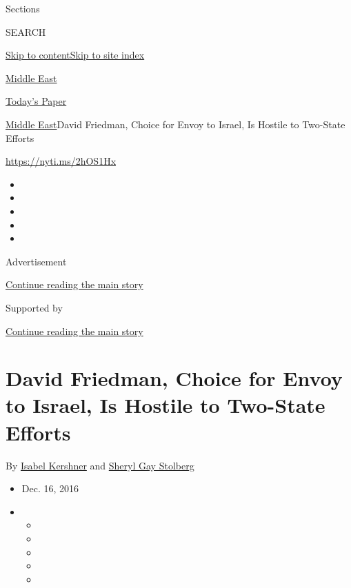 Sections

SEARCH

\protect\hyperlink{site-content}{Skip to
content}\protect\hyperlink{site-index}{Skip to site index}

\href{https://www.nytimes.com/section/world/middleeast}{Middle East}

\href{https://myaccount.nytimes.com/auth/login?response_type=cookie\&client_id=vi}{}

\href{https://www.nytimes.com/section/todayspaper}{Today's Paper}

\href{/section/world/middleeast}{Middle East}\textbar{}David Friedman,
Choice for Envoy to Israel, Is Hostile to Two-State Efforts

\url{https://nyti.ms/2hOS1Hx}

\begin{itemize}
\item
\item
\item
\item
\item
\end{itemize}

Advertisement

\protect\hyperlink{after-top}{Continue reading the main story}

Supported by

\protect\hyperlink{after-sponsor}{Continue reading the main story}

\hypertarget{david-friedman-choice-for-envoy-to-israel-is-hostile-to-two-state-efforts}{%
\section{David Friedman, Choice for Envoy to Israel, Is Hostile to
Two-State
Efforts}\label{david-friedman-choice-for-envoy-to-israel-is-hostile-to-two-state-efforts}}

By \href{https://www.nytimes.com/by/isabel-kershner}{Isabel Kershner}
and \href{http://www.nytimes.com/by/sheryl-gay-stolberg}{Sheryl Gay
Stolberg}

\begin{itemize}
\item
  Dec. 16, 2016
\item
  \begin{itemize}
  \item
  \item
  \item
  \item
  \item
  \end{itemize}
\end{itemize}

